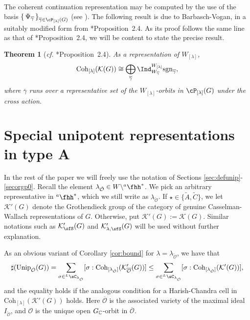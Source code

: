 \documentclass[12pt,a4paper]{amsart}
\newcommand{\CK}{{\mathcal {K}}}
\newcommand{\CO}{{\mathcal {O}}}
\newcommand{\g}{\mathfrak g}
\numberwithin{equation}{section}
\newtheorem{thm}{Theorem}[section]
\theoremstyle{remark}
\def\cf{\emph{cf.} }
\def\Irr{\mathrm{Irr}}
\def\Unip{\mathrm{Unip}}
\def\hha{{}^a\fhh}
\def\WLam{W_{\Lam}}
\def\LC{{}^{\scriptscriptstyle L}\sC}
\def\Coh{\mathrm{Coh}}
\newcommand{\Lam}{{[\lambda]}}
\begin{document}
The coherent continuation representation may be computed by the use of the basis  $\set{\Psi_{\olgamma}}_{\olgamma\in \cP_{\Lam}(G)}$ (see \cite[Section 14]{V4}).
The following result is due to Barbasch-Vogan, in a suitably modified form from \cite{BV.W}*{Proposition~2.4}. As its proof follows the same line as that of \cite{BV.W}*{Proposition~2.4}, we will be content to state the precise result.


\begin{thm}[{\cf \cite{BV.W}*{Proposition~2.4}}]
  \label{thm:cohHC}
 As a representation of $W_\Lam$,
  \[
    \Coh_{[\lambda]}(\CK(G)) \cong \bigoplus_{\overline \gamma}
    \Ind_{W_{\overline \gamma}}^{W_\Lam}  \mathrm{sgn}_{\overline \gamma},
  \]
  where $\overline \gamma$ runs over a representative set of the $\WLam$-orbits
  in $\cP_{\Lam}(G)$ under the cross action.
\end{thm}




\section{Special unipotent representations in type A}\label{sec:GL}


In the rest of the paper we will freely use  the notation of Sections \ref{sec:defunip}-\ref{secorgp0}. Recall the element $\lambda_{\check \CO}\in W\backslash \hha^*$. %
We pick an arbitrary representative in $\hha^*$, which we still write as $\lambda_{\check \CO}$. If $\star\in \{\widetilde A, \widetilde C\}$, we let $\CK'(G)$ denote the Grothendieck group of the category of genuine Casselman-Wallach representations of $G$. Otherwise, put $\CK'(G):=\CK(G)$. Similar notations such as $ \CK'_{\sfS}(G)$ and $\CK'_{\lambda,\sfS}(G)$ will be used without further explanation.

As an obvious variant of Corollary \ref{cor:bound} for $\lambda=\lambda_{\check \CO}$, we have  that
 \begin{equation}\label{boundc22}
     \sharp(\Unip_{\check \CO}(G)) =\sum_{\sigma\in \LC_{\lambda_{\check \CO}}} [\sigma: \Coh_{[\lambda_{\check \CO}]}(\CK_{\overline{\CO}}'(G))]  \leq \sum_{\sigma\in \LC_{\lambda_{\check \CO}}} [\sigma: \Coh_{[\lambda_{\check \CO}]}(\CK'(G))],
   \end{equation}
   and the equality holds if the analogous condition for a Harish-Chandra cell in $\Coh_{\Lam}(\CK'(G))$ holds.
Here $\overline{\CO}$ is the associated variety of the maximal ideal $I_{\check \CO}$, and $\CO$ is the unique open $G_{\mathbb{C}}$-orbit in  $\overline{\CO}$.
\end{document}
